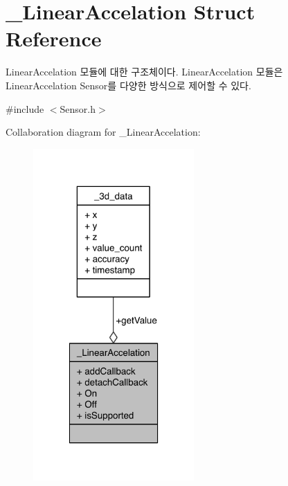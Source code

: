 \hypertarget{struct__LinearAccelation}{\section{\-\_\-\-Linear\-Accelation Struct Reference}
\label{struct__LinearAccelation}
}


Linear\-Accelation 모듈에 대한 구조체이다. Linear\-Accelation 모듈은 Linear\-Accelation Sensor를 다양한 방식으로 제어할 수 있다.  




{\ttfamily \#include $<$Sensor.\-h$>$}



Collaboration diagram for \-\_\-\-Linear\-Accelation\-:\nopagebreak
\begin{figure}[H]
\begin{center}
\leavevmode
\includegraphics[width=174pt]{dd/d17/struct__LinearAccelation__coll__graph}
\end{center}
\end{figure}
